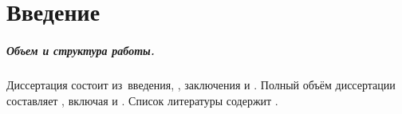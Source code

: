 
\chapter*{Введение}                         %



\paragraph*{Объем и структура работы.}
Диссертация состоит из~введения,
,
заключения и
.
Полный объём диссертации составляет
,
включая
и
.
Список литературы содержит
.
